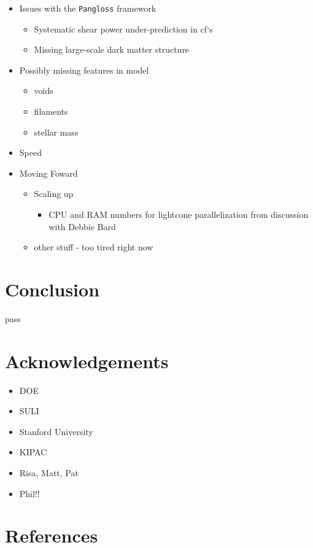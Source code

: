 \documentclass[%
 reprint,
 amsmath,amssymb,
 aps,
]{revtex4-1}
\begin{document}
\begin{itemize}
\item Issues with the \texttt{Pangloss} framework
    \begin{itemize}
    \item Systematic shear power under-prediction in cf`s
    \item Missing large-scale dark matter structure
    \end{itemize}
    \item Possibly missing features in model
        \begin{itemize}
        \item voids
        \item filaments
        \item stellar mass
        \end{itemize}
    \item Speed
\item Moving Foward
    \begin{itemize}
    \item Scaling up
        \begin{itemize}
        \item CPU and RAM numbers for lightcone parallelization from discussion with Debbie Bard
        \end{itemize}
    \item other stuff - too tired right now
    \end{itemize}
\end{itemize}

\section{Conclusion}

pass

\section{Acknowledgements}

\begin{itemize}
\item DOE
\item SULI
\item Stanford University
\item KIPAC
\item Risa, Matt, Pat
\item Phil!!
\end{itemize}

\section{References}
\end{document}

